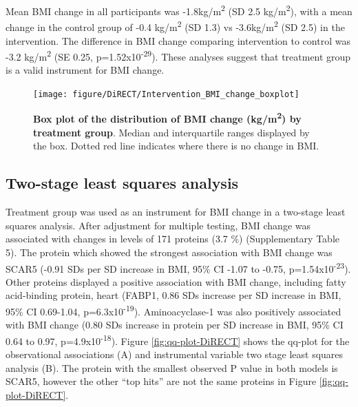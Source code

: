 \documentclass[11pt,twoside]{bristolthesis}
\begin{document}
Mean BMI change in all participants was -1.8kg/m\textsuperscript{2} (SD 2.5 kg/m\textsuperscript{2}), with a mean change in the control group of -0.4 kg/m\textsuperscript{2} (SD 1.3) vs -3.6kg/m\textsuperscript{2} (SD 2.5) in the intervention. The difference in BMI change comparing intervention to control was -3.2 kg/m\textsuperscript{2} (SE 0.25, p=1.52x10\textsuperscript{-29}). These analyses suggest that treatment group is a valid instrument for BMI change.



\begin{figure}
\texttt{[image: figure/DiRECT/Intervention\_BMI\_change\_boxplot]} \caption[Box plot of the distribution of BMI change (kg/m\textsuperscript{2}) by treatment group]{\textbf{Box plot of the distribution of BMI change (kg/m\textsuperscript{2}) by treatment group}. Median and interquartile ranges displayed by the box. Dotted red line indicates where there is no change in BMI.}\label{fig:box-BMI-change}
\end{figure}
\hypertarget{two-stage-least-squares-analysis}{%
\subsection{Two-stage least squares analysis}\label{two-stage-least-squares-analysis}}

Treatment group was used as an instrument for BMI change in a two-stage least squares analysis. After adjustment for multiple testing, BMI change was associated with changes in levels of 171 proteins (3.7 \%) (Supplementary Table 5). The protein which showed the strongest association with BMI change was SCAR5 (-0.91 SDs per SD increase in BMI, 95\% CI -1.07 to -0.75, p=1.54x10\textsuperscript{-23}). Other proteins displayed a positive association with BMI change, including fatty acid-binding protein, heart (FABP1, 0.86 SDs increase per SD increase in BMI, 95\% CI 0.69-1.04, p=6.3x10\textsuperscript{-19}). Aminoacyclase-1 was also positively associated with BMI change (0.80 SDs increase in protein per SD increase in BMI, 95\% CI 0.64 to 0.97, p=4.9x10\textsuperscript{-18}). Figure \ref{fig:qq-plot-DiRECT} shows the qq-plot for the observational associations (A) and instrumental variable two stage least squares analysis (B). The protein with the smallest observed P value in both models is SCAR5, however the other ``top hits'' are not the same proteins in Figure \ref{fig:qq-plot-DiRECT}.
\end{document}
